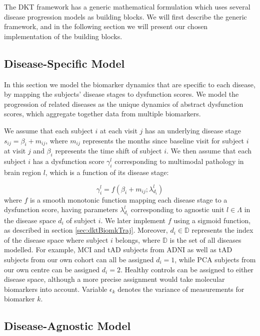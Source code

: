 \documentclass{llncs}
\begin{document}
The DKT framework has a generic mathematical formulation which uses several disease progression models as building blocks. We will first describe the generic framework, and in the following section we will present our chosen implementation of the building blocks. 

\subsection{Disease-Specific Model}

In this section we model the biomarker dynamics that are specific to each disease, by mapping the subjects' disease stages to dysfunction scores. We model the progression of related diseases as the unique dynamics of abstract dysfunction scores, which aggregate together data from multiple biomarkers. 

We assume that each subject $i$ at each visit $j$ has an underlying disease stage $s_{ij} = \beta_i + m_{ij}$, where $m_{ij}$ represents the months since baseline visit for subject $i$ at visit $j$ and $\beta_i$ represents the time shift of subject $i$. We then assume that each subject $i$ has a dysfunction score $\gamma_i^l$ corresponding to multimodal pathology in brain region $l$, which is a function of its disease stage:

\begin{equation}
\label{eqDysfunctionScoreDef}
 \gamma_i^l = f(\beta_i + m_{ij}; \lambda_{d_i}^l)
\end{equation}
where $f$ is a smooth monotonic function mapping each disease stage to a dysfunction score, having parameters $\lambda_{d_i}^l$ corresponding to agnostic unit $l \in \Lambda$ in the disease space $d_i$ of subject $i$. We later implement $f$ using a sigmoid function, as described in section \ref{sec:dktBiomkTraj}. Moreover, $d_i \in \mathbb{D}$ represents the index of the disease space where subject $i$ belongs, where $\mathbb{D}$ is the set of all diseases modelled. For example, MCI and tAD subjects from ADNI as well as tAD subjects from our own cohort can all be assigned $d_i=1$, while PCA subjects from our own centre can be assigned $d_i=2$. Healthy controls can be assigned to either disease space, although a more precise assignment would take molecular biomarkers into account. Variable $\epsilon_k$ denotes the variance of measurements for biomarker $k$. 

\subsection{Disease-Agnostic Model}
\end{document}
